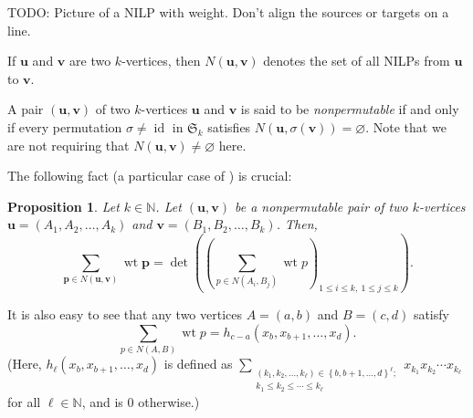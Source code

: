 \documentclass[reqno]{amsart}%
\newcommand{\0}{\phantom{c}}
\let\sumnonlimits\sum
\renewcommand{\sum}{\sumnonlimits\limits}
\newcommand{\defn}[1]{{\color{darkred}\emph{#1}}}
\theoremstyle{plain}
\newtheorem{prop}[thm]{Proposition}
\theoremstyle{definition}
\numberwithin{equation}{section}
\begin{document}
TODO: Picture of a NILP with weight. Don't align the sources or targets on a line.

If $\mathbf{u}$ and $\mathbf{v}$ are two $k$-vertices, then
\defn{$N\left( \mathbf{u},\mathbf{v}\right)  $} denotes the set of all NILPs
from $\mathbf{u}$ to $\mathbf{v}$.

A pair $\left(  \mathbf{u},\mathbf{v}\right)  $ of two $k$-vertices
$\mathbf{u}$ and $\mathbf{v}$ is said to be \defn{nonpermutable} if and only
if every permutation $\sigma\neq\operatorname*{id}$ in $\mathfrak{S}_{k}$
satisfies $N\left(  \mathbf{u},\sigma\left(  \mathbf{v}\right)  \right)
=\varnothing$. Note that we are not requiring that $N\left(  \mathbf{u}%
,\mathbf{v}\right)  \neq\varnothing$ here.

The following fact (a particular case of \cite[Corollary 2]{GesVie89}) is crucial:

\begin{prop}
\label{prop.LGV.nonper}Let $k\in\mathbb{N}$. Let $\left(  \mathbf{u}%
,\mathbf{v}\right)  $ be a nonpermutable pair of two $k$-vertices
$\mathbf{u}=\left(  A_{1},A_{2},\ldots,A_{k}\right)  $ and $\mathbf{v}=\left(
B_{1},B_{2},\ldots,B_{k}\right)  $. Then,%
\[
\sum_{\mathbf{p}\in N\left(  \mathbf{u},\mathbf{v}\right)  }\operatorname*{wt}%
\mathbf{p}=\det\left(  \left(  \sum_{p\in N\left(  A_{i},B_{j}\right)
}\operatorname*{wt}p\right)  _{1\leq i\leq k,\ 1\leq j\leq k}\right)  .
\]

\end{prop}

It is also easy to see that any two vertices $A=\left(  a,b\right)  $ and
$B=\left(  c,d\right)  $ satisfy%
\begin{equation}
\sum_{p\in N\left(  A,B\right)  }\operatorname*{wt}p=h_{c-a}\left(
x_{b},x_{b+1},\ldots,x_{d}\right)  . \label{eq.LGV.single-paths}%
\end{equation}
(Here, $h_{\ell}\left(  x_{b},x_{b+1},\ldots,x_{d}\right)  $ is defined as
$\sum_{\substack{\left(  k_{1},k_{2},\ldots,k_{\ell}\right)  \in\left\{
b,b+1,\ldots,d\right\}  ^{\ell};\\k_{1}\leq k_{2}\leq\cdots\leq k_{\ell}%
}}x_{k_{1}}x_{k_{2}}\cdots x_{k_{\ell}}$ for all $\ell\in\mathbb{N}$, and is
$0$ otherwise.)
\end{document}
